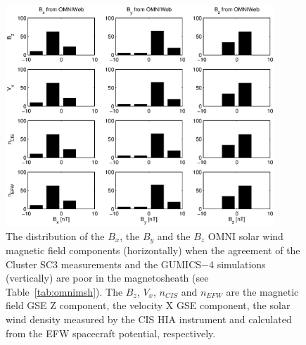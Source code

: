 \documentclass[linenumbers,draft]{agujournal}
\begin{document}
\begin{figure}[h]
\centering
\includegraphics[width=0.9\textwidth,angle=0]{swe-2020-corr-f16.eps}  
\caption{The distribution of the $B_{x}$, the $B_{y}$ and the $B_{z}$ OMNI solar wind magnetic field components (horizontally) when the agreement of the Cluster SC3 measurements and the GUMICS$-$4 simulations (vertically) are poor in the magnetosheath (see Table~\ref{tab:omnimsh}). The $B_{z}$, $V_{x}$, $n_{CIS}$ and $n_{EFW}$ are the magnetic field GSE Z component, the velocity X GSE component, the solar wind density measured by the CIS HIA instrument and calculated from the EFW spacecraft potential, respectively.}
\label{fig:mshomnibxyz}
\end{figure}

\pagebreak
\end{document}
